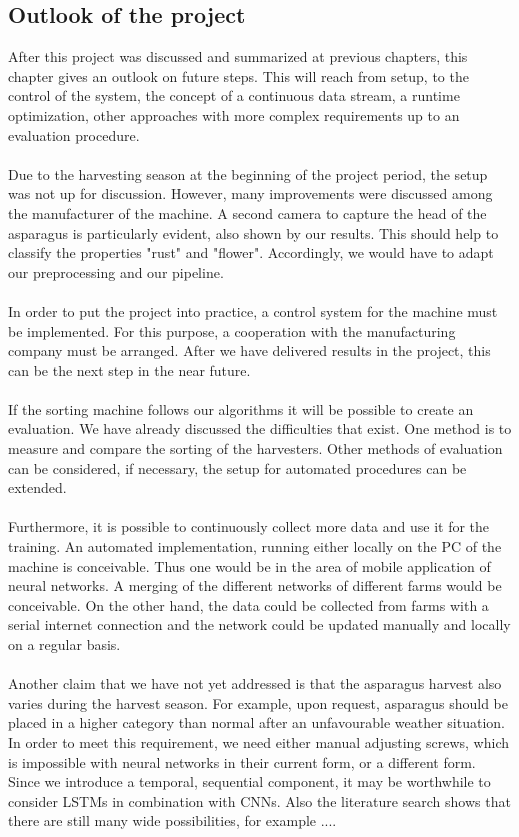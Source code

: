 \subsection{Outlook of the project}
\label{sec:Outlook}

After this project was discussed and summarized at previous chapters, this chapter gives an outlook on future steps. This will reach from  setup, to the control of the system, the concept of a continuous data stream, a runtime optimization, other approaches with more complex requirements up to an evaluation procedure. \\
\\
Due to the harvesting season at the beginning of the project period, the setup was not up for discussion. However, many improvements were discussed among the manufacturer of the machine. A second camera to capture the head of the asparagus is particularly evident, also shown by our results. This should help to classify the properties "rust" and "flower". Accordingly, we would have to adapt our preprocessing and our pipeline. \\
\\
In order to put the project into practice, a control system for the machine must be implemented. For this purpose, a cooperation with the manufacturing company must be arranged. After we have delivered results in the project, this can be the next step in the near future. \\
\\
If the sorting machine follows our algorithms it will be possible to create an evaluation. We have already discussed the difficulties that exist. One method is to measure and compare the sorting of the harvesters. Other methods of evaluation can be considered, if necessary, the setup for automated procedures can be extended. \\
\\
Furthermore, it is possible to continuously collect more data and use it for the training. An automated implementation, running either locally on the PC of the machine is conceivable. Thus one would be in the area of mobile application of neural networks. A merging of the different networks of different farms would be conceivable. On the other hand, the data could be collected from farms with a serial internet connection and the network could be updated manually and locally on a regular basis. \\
\\
Another claim that we have not yet addressed is that the asparagus harvest also varies during the harvest season. For example, upon request, asparagus should be placed in a higher category than normal after an unfavourable weather situation. In order to meet this requirement, we need either manual adjusting screws, which is impossible with neural networks in their current form, or a different form. Since we introduce a temporal, sequential component, it may be worthwhile to consider LSTMs in combination with CNNs. Also the literature search shows that there are still many wide possibilities, for example ....


